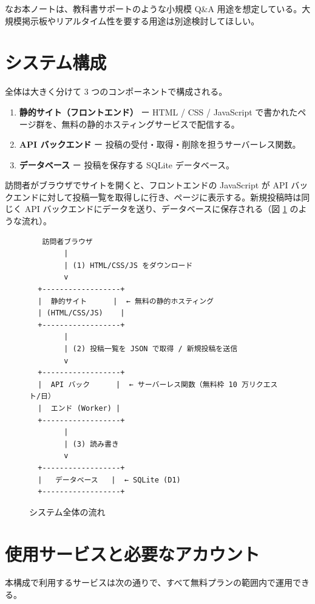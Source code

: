 \documentclass[11pt,a4paper,uplatex,dvipdfmx]{jsarticle}
\begin{document}
なお本ノートは、教科書サポートのような小規模 Q\&A 用途を想定している。大規模掲示板やリアルタイム性を要する用途は別途検討してほしい。

\section{システム構成}

全体は大きく分けて 3 つのコンポーネントで構成される。

\begin{enumerate}
\item \textbf{静的サイト（フロントエンド）} ー HTML / CSS / JavaScript で書かれたページ群を、無料の静的ホスティングサービスで配信する。
\item \textbf{API バックエンド} ー 投稿の受付・取得・削除を担うサーバーレス関数。
\item \textbf{データベース} ー 投稿を保存する SQLite データベース。
\end{enumerate}

訪問者がブラウザでサイトを開くと、フロントエンドの JavaScript が API バックエンドに対して投稿一覧を取得しに行き、ページに表示する。新規投稿時は同じく API バックエンドにデータを送り、データベースに保存される（図 \ref{fig:overall} のような流れ）。

\begin{figure}[h]
\centering
\begin{minipage}{0.92\textwidth}
\begin{verbatim}
   訪問者ブラウザ
        |
        | (1) HTML/CSS/JS をダウンロード
        v
  +------------------+
  |  静的サイト      |  ← 無料の静的ホスティング
  | (HTML/CSS/JS)    |
  +------------------+
        |
        | (2) 投稿一覧を JSON で取得 / 新規投稿を送信
        v
  +------------------+
  |  API バック      |  ← サーバーレス関数（無料枠 10 万リクエスト/日）
  |  エンド (Worker) |
  +------------------+
        |
        | (3) 読み書き
        v
  +------------------+
  |   データベース   |  ← SQLite (D1)
  +------------------+
\end{verbatim}
\end{minipage}
\caption{システム全体の流れ}
\label{fig:overall}
\end{figure}

\section{使用サービスと必要なアカウント}

本構成で利用するサービスは次の通りで、すべて無料プランの範囲内で運用できる。
\end{document}
